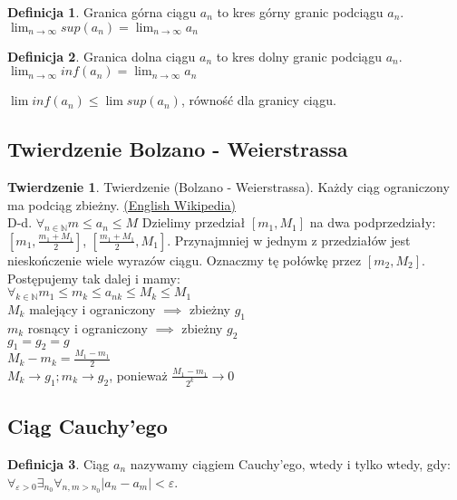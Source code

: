 \documentclass{article}
\theoremstyle{definition}
\newtheorem{de}{Definicja}[subsection]
\theoremstyle{definition}
\newtheorem{tw}{Twierdzenie}[subsection]
\theoremstyle{definition}
\theoremstyle{definition}
\begin{document}
\begin{de}
Granica górna ciągu $a_n$ to kres górny granic podciągu $a_n$.\\
$\lim_{n\rightarrow \infty} sup(a_n) = \lim_{n\rightarrow\infty} a_n$
\end{de}

\begin{de}
Granica dolna ciągu $a_n$ to kres dolny granic podciągu $a_n$.\\
$\lim_{n\rightarrow \infty} inf(a_n) = \lim_{n\rightarrow\infty} a_n$
\end{de}

$\lim inf(a_n)\leq \lim sup(a_n)$, równość dla granicy ciągu.

\subsection{Twierdzenie Bolzano - Weierstrassa}

\begin{tw}
Twierdzenie (Bolzano - Weierstrassa). Każdy ciąg ograniczony ma podciąg zbieżny.
\href{https://en.wikipedia.org/wiki/Bolzano%E2%80%93Weierstrass_theorem}{(English Wikipedia)}\\
D-d. $\forall_{n\in\mathbb{N}} m \leq a_n \leq M$ Dzielimy przedział $[m_1,M_1]$ na dwa podprzedziały:
$[m_1, \frac{m_1+M_1}{2}]$, $[\frac{m_1+M_1}{2},M_1]$. Przynajmniej w jednym z przedziałów jest nieskończenie wiele wyrazów ciągu.
Oznaczmy tę połówkę przez $[m_2, M_2]$. Postępujemy tak dalej i mamy:\\
$\forall_{k\in\mathbb{N}} m_1\leq m_k\leq a_{nk} \leq M_k \leq M_1$\\
$M_k$ malejący i ograniczony $\implies$ zbieżny $g_1$\\
$m_k$ rosnący i ograniczony $\implies$ zbieżny $g_2$\\
$g_1=g_2=g$\\
$M_k-m_k=\frac{M_1-m_1}{2}$\\
$M_k\rightarrow g_1; m_k\rightarrow g_2$, ponieważ $\frac{M_1-m_1}{2^k}\rightarrow 0$

\end{tw}

\subsection{Ciąg Cauchy'ego}

\begin{de}
Ciąg $a_n$ nazywamy ciągiem Cauchy'ego, wtedy i tylko wtedy, gdy:\\
$\forall_{\varepsilon > 0}\exists_{n_0}\forall_{n,m>n_0} |a_n-a_m|<\varepsilon$.
\end{de}
\end{document}
